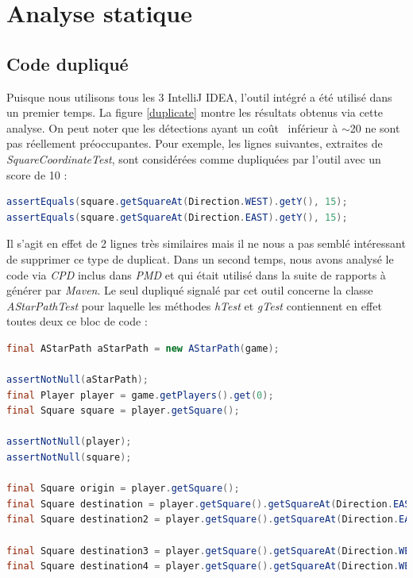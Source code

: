 \documentclass[12pt, openany]{report}
\begin{document}
\section{Analyse statique}
\subsection{Code dupliqué}
Puisque nous utilisons tous les 3 IntelliJ IDEA, l'outil intégré a été utilisé dans un premier temps. La figure \ref{duplicate} montre les résultats obtenus via cette analyse.
On peut noter que les détections ayant un \og coût \fg \, inférieur à $\sim$20 ne sont pas réellement préoccupantes. Pour exemple, les lignes suivantes, extraites de \textit{SquareCoordinateTest}, sont considérées comme dupliquées par l'outil avec un score de 10 :
\begin{lstlisting}[language=java]
assertEquals(square.getSquareAt(Direction.WEST).getY(), 15);
assertEquals(square.getSquareAt(Direction.EAST).getY(), 15);
\end{lstlisting}
Il s'agit en effet de 2 lignes très similaires mais il ne nous a pas semblé intéressant de supprimer ce type de duplicat. 
Dans un second temps, nous avons analysé le code via \textit{CPD} inclus dans \textit{PMD} et qui était utilisé dans la suite de rapports à générer par \textit{Maven}. Le seul dupliqué signalé par cet outil concerne la classe \textit{AStarPathTest} pour laquelle les méthodes \textit{hTest} et \textit{gTest} contiennent en effet toutes deux ce bloc de code :
\begin{lstlisting}[language=java]
final AStarPath aStarPath = new AStarPath(game);

assertNotNull(aStarPath);
final Player player = game.getPlayers().get(0);
final Square square = player.getSquare();

assertNotNull(player);
assertNotNull(square);

final Square origin = player.getSquare();
final Square destination = player.getSquare().getSquareAt(Direction.EAST);
final Square destination2 = player.getSquare().getSquareAt(Direction.EAST).getSquareAt(Direction.EAST);

final Square destination3 = player.getSquare().getSquareAt(Direction.WEST);
final Square destination4 = player.getSquare().getSquareAt(Direction.WEST).getSquareAt(Direction.WEST);
\end{lstlisting}
\end{document}
